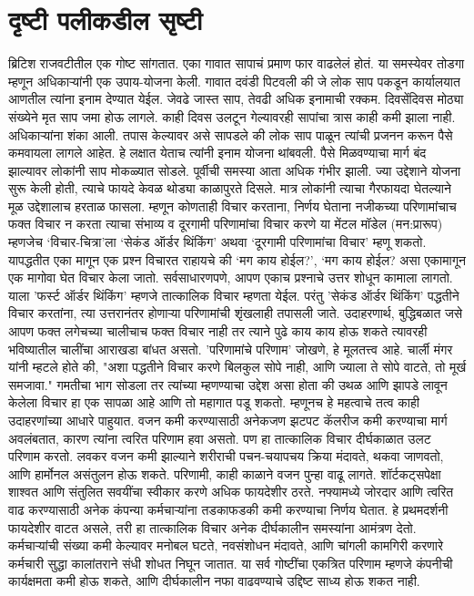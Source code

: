 \chapter{दृष्टी पलीकडील सृष्टी}

ब्रिटिश राजवटीतील एक गोष्ट सांगतात. एका गावात सापाचं प्रमाण फार वाढलेलं होतं. या समस्येवर तोडगा म्हणून अधिकाऱ्यांनी एक उपाय-योजना केली. गावात दवंडी पिटवली की जे लोक साप पकडून कार्यालयात आणतील त्यांना इनाम देण्यात येईल. जेवढे जास्त साप, तेवढी अधिक इनामाची रक्कम. दिवसेंदिवस मोठ्या संख्येने मृत साप जमा होऊ लागले. काही दिवस उलटून गेल्यावरही सापांचा त्रास काही कमी झाला नाही. अधिकाऱ्यांना शंका आली. तपास केल्यावर असे सापडले की लोक साप पाळून त्यांची प्रजनन करून पैसे कमवायला लागले आहेत. हे लक्षात येताच त्यांनी इनाम योजना थांबवली. पैसे मिळवण्याचा मार्ग बंद झाल्यावर लोकांनी साप मोकळ्यात सोडले. पूर्वीची समस्या आता अधिक गंभीर झाली. ज्या उद्देशाने योजना सुरू केली होती, त्याचे फायदे केवळ थोड्या काळापुरते दिसले. मात्र लोकांनी त्याचा गैरफायदा घेतल्याने मूळ उद्देशालाच हरताळ फासला.
 म्हणून कोणताही विचार करताना, निर्णय घेताना नजीकच्या परिणामांचाच फक्त विचार न करता त्याचा संभाव्य व दूरगामी परिणामांचा विचार करणे या मेंटल मॉडेल (मन:प्रारूप) म्हणजेच ‘विचार-चित्रा’ला ‘सेकंड ऑर्डर थिंकिंग’  अथवा ‘दूरगामी परिणामांचा विचार’ म्हणू शकतो.  यापद्धतीत एका मागून एक प्रश्न विचारत राहायचे की ‘मग काय होईल?’, ‘मग काय होईल? असा एकामागून एक मागोवा घेत विचार केला जातो. सर्वसाधारणपणे, आपण एकाच प्रश्नाचे उत्तर शोधून कामाला लागतो. याला 'फर्स्ट ऑर्डर थिंकिंग' म्हणजे तात्कालिक विचार म्हणता येईल. परंतु 'सेकंड ऑर्डर थिंकिंग' पद्धतीने विचार करतांना, त्या उत्तरानंतर होणाऱ्या परिणामांची शृंखलाही तपासली जाते.
उदाहरणार्थ, बुद्धिबळात जसे आपण फक्त लगेचच्या चालीचाच फक्त विचार नाही तर त्याने पुढे काय काय होऊ शकते त्यावरही भविष्यातील चालींचा आराखडा बांधत असतो. 'परिणामांचे परिणाम' जोखणे, हे मूलतत्त्व आहे. चार्ली मंगर यांनी म्हटले होते की, "अशा पद्धतीने विचार करणे बिलकुल सोपे नाही, आणि ज्याला ते सोपे वाटते, तो मूर्ख समजावा." गमतीचा भाग सोडला तर त्यांच्या म्हणण्याचा उद्देश असा होता की उथळ आणि झापडे लावून केलेला विचार हा एक सापळा आहे आणि तो महागात पडू शकतो. म्हणूनच हे महत्वाचे तत्व काही उदाहरणांच्या आधारे पाहुयात. 
वजन कमी करण्यासाठी अनेकजण झटपट कॅलरीज कमी करण्याचा मार्ग अवलंबतात, कारण त्यांना त्वरित परिणाम हवा असतो. पण हा तात्कालिक विचार दीर्घकाळात उलट परिणाम करतो. लवकर वजन कमी झाल्याने शरीराची पचन-चयापचय क्रिया मंदावते, थकवा जाणवतो, आणि हार्मोनल असंतुलन होऊ शकते. परिणामी, काही काळाने वजन पुन्हा वाढू लागते. शॉर्टकट्सपेक्षा शाश्वत आणि संतुलित सवयींचा स्वीकार करणे अधिक फायदेशीर ठरते.
नफ्यामध्ये जोरदार आणि त्वरित वाढ करण्यासाठी अनेक कंपन्या कर्मचार्‍यांना तडकाफडकी कमी करण्याचा निर्णय घेतात. हे प्रथमदर्शनी फायदेशीर वाटत असले, तरी हा तात्कालिक विचार अनेक दीर्घकालीन समस्यांना आमंत्रण देतो. कर्मचार्‍यांची संख्या कमी केल्यावर मनोबल घटते, नवसंशोधन मंदावते, आणि चांगली कामगिरी करणारे कर्मचारी सुद्धा कालांतराने संधी शोधत निघून जातात. या सर्व गोष्टींचा एकत्रित परिणाम म्हणजे कंपनीची कार्यक्षमता कमी होऊ शकते, आणि दीर्घकालीन नफा वाढवण्याचे उद्दिष्ट साध्य होऊ शकत नाही.
